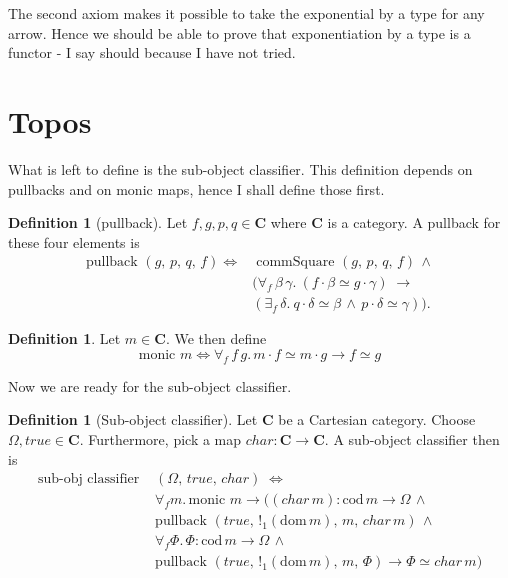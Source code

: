 \documentclass[a4paper, 11pt]{article}
\theoremstyle{definition}
\newtheorem{definition}[theorem]{Definition}
\newcommand{\cat}{%
	\mathbf %
}
\newcommand{\domain}[ 1 ]{%
	\mathrm{dom} \, #1 %
}
\newcommand{\codomain}[ 1 ]{%
	\mathrm{cod} \, #1%
}
\newcommand{\notion}[1]{\text{#1 }}
\newcommand{\commSquare}[4]{\notion{commSquare} (#1, \, #2, \, #3, \, #4)}
\newcommand{\pullback}[4]{\notion{pullback} (#1, \, #2, \, #3, \, #4)}
\begin{document}
The second axiom makes it possible to take the exponential by a type for any arrow. Hence we should be able to prove that exponentiation by a type is a functor - I say should because I have not tried.

\section{Topos}

What is left to define is the sub-object classifier. This definition depends on pullbacks and on monic maps, hence I shall define those first.

\begin{definition}[pullback]
	Let $f,g,p,q \in \cat C$ where $\cat C$ is a category. A pullback for these four elements is
	\begin{align*}
		\pullback{g}{p}{q}{f} \Longleftrightarrow & \; \commSquare{g}{p}{q}{f} \, \wedge \\
		&(\forall_f \, \beta \, \gamma. \: (f \cdot \beta \simeq g \cdot \gamma) \; \longrightarrow \\
		&(\exists_f \, \delta. \: q \cdot \delta \simeq \beta \, \wedge \, p \cdot \delta \simeq \gamma)).
	\end{align*}
\end{definition}

\begin{definition}
	Let $m \in \cat C$. We then define
	\[ \notion{monic} m \Longleftrightarrow \forall_f \,f \, g. \, m \cdot f \simeq m \cdot g \longrightarrow f \simeq g \]
\end{definition}

Now we are ready for the sub-object classifier.

\begin{definition}[Sub-object classifier]
	Let $\cat C$ be a Cartesian category. Choose $ \Omega, true \in \cat C$. Furthermore, pick a map $char: \cat C \to \cat C$. A sub-object classifier then is
	\begin{align*}
		\notion{sub-obj classifier}&(\Omega, \, true, \, char) \; \Longleftrightarrow \\ 
		& \forall_f m. \, \notion{monic} m \longrightarrow ((char \, m):\codomain{m} \rightarrow \Omega \, \wedge \\
		&\pullback{true}{!_1 (\domain{m})}{m}{char \, m} \, \wedge \\
		& \forall_f \Phi. \, \Phi:\codomain{m} \rightarrow \Omega \, \wedge \\ &\pullback{true}{!_1(\domain{m})}{m}{\Phi} \longrightarrow \Phi \simeq char \, m)
	\end{align*}
\end{definition}
\end{document}
